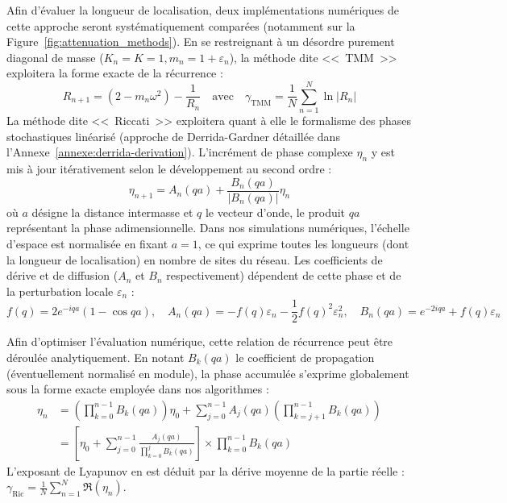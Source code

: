 \documentclass[11pt, a4paper, twoside]{article}
\begin{document}
Afin d'évaluer la longueur de localisation, deux implémentations numériques de cette approche seront systématiquement comparées (notamment sur la Figure~\ref{fig:attenuation_methods}). En se restreignant à un désordre purement diagonal de masse ($K_n = K = 1, m_n = 1+\varepsilon_n$), la méthode dite <<~TMM~>> exploitera la forme exacte de la récurrence :
\begin{equation}\label{eq:tmm_computation}
    R_{n+1} = (2 - m_n\omega^2) - \frac{1}{R_n} \quad \text{avec} \quad \gamma_{\text{TMM}} = \frac{1}{N}\sum_{n=1}^N \ln|R_n|
\end{equation}
La méthode dite <<~Riccati~>> exploitera quant à elle le formalisme des phases stochastiques linéarisé (approche de Derrida-Gardner détaillée dans l'Annexe~\ref{annexe:derrida-derivation}). L'incrément de phase complexe $\eta_n$ y est mis à jour itérativement selon le développement au second ordre :
\begin{equation*}
    \eta_{n+1} = A_n(qa) + \frac{B_n(qa)}{|B_n(qa)|} \eta_n
\end{equation*}
où $a$ désigne la distance intermasse et $q$ le vecteur d'onde, le produit $qa$ représentant la phase adimensionnelle. Dans nos simulations numériques, l'échelle d'espace est normalisée en fixant $a = 1$, ce qui exprime toutes les longueurs (dont la longueur de localisation) en nombre de sites du réseau. Les coefficients de dérive et de diffusion ($A_n$ et $B_n$ respectivement) dépendent de cette phase et de la perturbation locale $\varepsilon_n$ :
\begin{equation*}
    f(q) = 2 e^{-iqa}(1 - \cos qa), \quad A_n(qa) = -f(q)\varepsilon_n - \frac{1}{2}f(q)^2\varepsilon_n^2, \quad B_n(qa) = e^{-2iqa} + f(q)\varepsilon_n
\end{equation*}

Afin d'optimiser l'évaluation numérique, cette relation de récurrence peut être déroulée analytiquement. En notant $B_k(qa)$ le coefficient de propagation (éventuellement normalisé en module), la phase accumulée s'exprime globalement sous la forme exacte employée dans nos algorithmes :
\begin{align}\label{eq:riccati_phase_global}
    \eta_n &= \left( \prod_{k=0}^{n-1} B_k(qa) \right) \eta_0 + \sum_{j=0}^{n-1} A_j(qa) \left( \prod_{k=j+1}^{n-1} B_k(qa) \right) \nonumber \\
    &= \left[ \eta_0 + \sum_{j=0}^{n-1} \frac{A_j(qa)}{\prod_{k=0}^{j} B_k(qa)} \right] \times \prod_{k=0}^{n-1} B_k(qa)
\end{align}
L'exposant de Lyapunov en est déduit par la dérive moyenne de la partie réelle : $\gamma_{\text{Ric}} = \frac{1}{N} \sum_{n=1}^N \Re(\eta_n)$.
\end{document}
